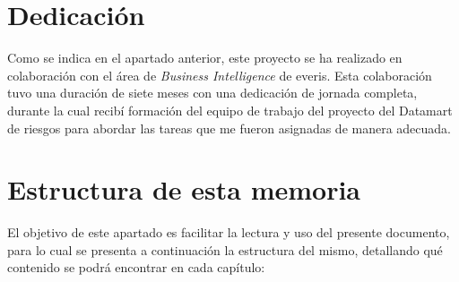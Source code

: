 \documentclass[a4paper, 12pt]{book}
\begin{document}
\section{Dedicación}
\label{sec:dedicacion}
Como se indica en el apartado anterior, este proyecto se ha realizado en colaboración con el área de \textit{Business Intelligence} de everis. Esta colaboración tuvo una duración de siete meses con una dedicación de jornada completa, durante la cual recibí formación del equipo de trabajo del proyecto del Datamart de riesgos para abordar las tareas que me fueron asignadas de manera adecuada. 


\section{Estructura de esta memoria}
\label{sec:estructura}
El objetivo de este apartado es facilitar la lectura y uso del presente documento, para lo cual se presenta a continuación la estructura del mismo, detallando qué contenido se podrá encontrar en cada capítulo:
\end{document}
